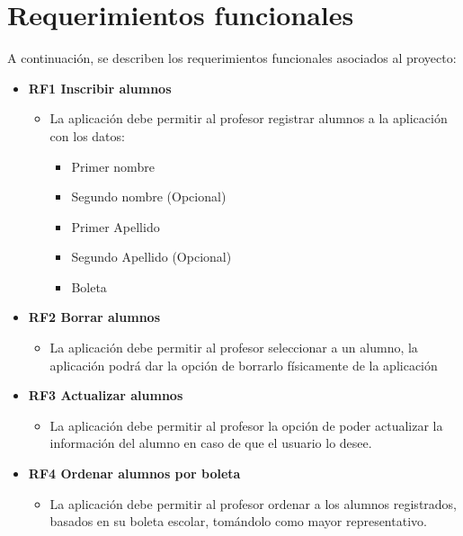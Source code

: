 \section{Requerimientos funcionales}

A continuación, se describen los requerimientos funcionales asociados al proyecto:
\begin{itemize}
	\item \textbf{RF1 Inscribir alumnos} 
	\begin{itemize}
		\item La aplicación debe permitir al profesor registrar alumnos a la aplicación con los datos:
		\begin{itemize}
			\item Primer nombre
			\item Segundo nombre (Opcional)
			\item Primer Apellido
			\item Segundo Apellido (Opcional)
			\item Boleta
			
		\end{itemize}
	\end{itemize}
	\item \textbf{RF2 Borrar alumnos} 
	\begin{itemize}
		\item La aplicación debe permitir al profesor seleccionar a un alumno, la aplicación podrá dar la opción de borrarlo físicamente de la aplicación
	\end{itemize}
	
	\item \textbf{RF3 Actualizar alumnos} 
	\begin{itemize}
		\item 	La aplicación debe permitir al profesor la opción de poder actualizar la información del alumno en caso de que el usuario lo desee.
	\end{itemize}
	\item \textbf{RF4 Ordenar alumnos por boleta} 
	\begin{itemize}
		\item La aplicación debe permitir al profesor ordenar a los alumnos registrados, basados en su boleta escolar, tomándolo como mayor representativo.
	\end{itemize}
\end{itemize}
